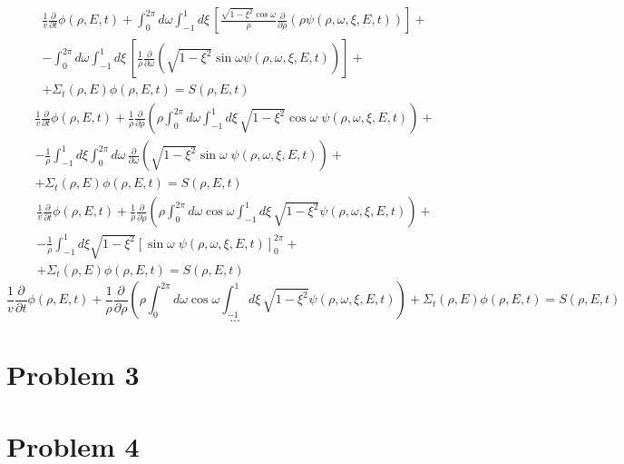 \documentclass{article}
\newcommand{\p}{\partial}
\newcommand{\Xs}{\Sigma}
\begin{document}
\begin{align*}
\frac{1}{v}\frac{\p}{\p t}\phi(\rho,E,t) + \int_0^{2\pi} d\omega \int_{-1}^{1} d\xi \, \left[ \frac{\sqrt{1-\xi^2}\cos\omega}{\rho} \frac{\p}{\p \rho}\left( \rho\psi(\rho,\omega,\xi,E,t) \right)\right] + \\
- \int_0^{2\pi} d\omega \int_{-1}^{1} d\xi \, \left[ \frac{1}{\rho} \frac{\p}{\p \omega}\left( \sqrt{1-\xi^2}\sin\omega \psi(\rho,\omega,\xi,E,t) \right)\right] + \\
+ \Xs_t(\rho,E) \phi(\rho,E,t) = S(\rho,E,t)
\end{align*}
\begin{align*}
\frac{1}{v}\frac{\p}{\p t}\phi(\rho,E,t) + \frac{1}{\rho}\frac{\p}{\p \rho}\left(\rho \int_0^{2\pi} d\omega \int_{-1}^{1} d\xi \, \sqrt{1-\xi^2}\cos\omega \; \psi(\rho,\omega,\xi,E,t) \right) + \\
-\frac{1}{\rho} \int_{-1}^{1} d\xi \int_0^{2\pi} d\omega \, \frac{\p}{\p \omega}\left( \sqrt{1-\xi^2}\sin\omega \; \psi(\rho,\omega,\xi,E,t) \right) + \\
+ \Xs_t(\rho,E) \phi(\rho,E,t) = S(\rho,E,t)
\end{align*}
\begin{align*}
\frac{1}{v}\frac{\p}{\p t}\phi(\rho,E,t) + \frac{1}{\rho}\frac{\p}{\p \rho}\left(\rho \int_0^{2\pi} d\omega \cos\omega \int_{-1}^{1} d\xi \, \sqrt{1-\xi^2} \psi(\rho,\omega,\xi,E,t) \right) + \\
-\frac{1}{\rho} \int_{-1}^{1} d\xi \sqrt{1-\xi^2} \left[ \sin\omega \; \psi(\rho,\omega,\xi,E,t) \right]_0^{2\pi} + \\
+ \Xs_t(\rho,E) \phi(\rho,E,t) = S(\rho,E,t)
\end{align*}
$$ \frac{1}{v}\frac{\p}{\p t}\phi(\rho,E,t) + \frac{1}{\rho}\frac{\p}{\p \rho}\left(\rho \int_0^{2\pi} d\omega \cos\omega \int_{-1}^{1} d\xi \, \sqrt{1-\xi^2} \psi(\rho,\omega,\xi,E,t) \right) + \Xs_t(\rho,E) \phi(\rho,E,t) = S(\rho,E,t) $$
$$...$$




\section*{Problem 3}





\section*{Problem 4}
\end{document}
